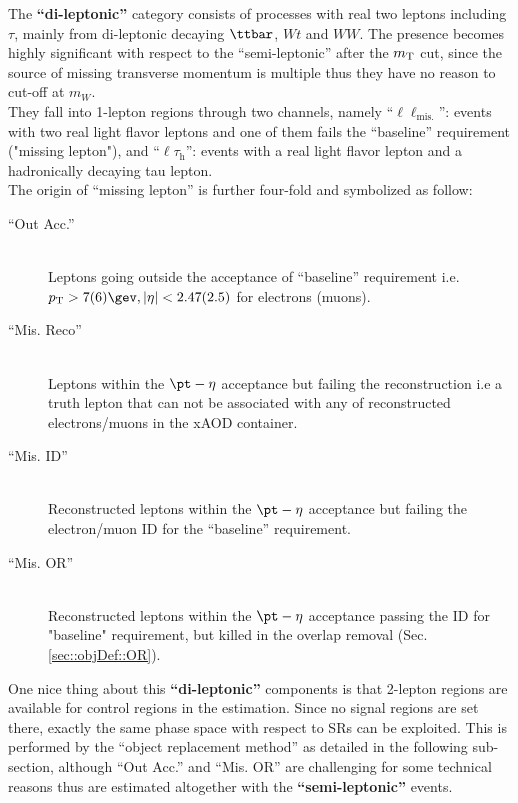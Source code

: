 The \textbf{``di-leptonic''} category consists of processes with real two leptons including $\tau$, mainly from di-leptonic decaying $\ttbar$, $Wt$ and $WW$. The presence becomes highly significant with respect to the ``semi-leptonic'' after the $m_{\mathrm{T}}$ cut, since the source of missing transverse momentum is multiple thus they have no reason to cut-off at $m_{W}$.  \\
They fall into 1-lepton regions through two channels, namely ``$\ell\ell_{\mathrm{mis.}}$'': events with two real light flavor leptons and one of them fails the ``baseline'' requirement ("missing lepton"), and ``$\ell\tau_{\mathrm{h}}$'': events with a real light flavor lepton and a hadronically decaying tau lepton. \\
%
The origin of ``missing lepton'' is further four-fold and symbolized as follow: 
\begin{description}
\item [``Out Acc.''] \mbox{} \\
 Leptons going outside the acceptance of ``baseline'' requirement i.e. $p_{\mathrm{T}}>7(6)\gev, |\eta|<2.47(2.5)$ for electrons (muons).
\item [``Mis. Reco''] \mbox{} \\
 Leptons within the $\pt-\eta$ acceptance but failing the reconstruction i.e a truth lepton that can not be associated with any of reconstructed electrons/muons in the xAOD container.
\item [``Mis. ID''] \mbox{} \\
 Reconstructed leptons within the $\pt-\eta$ acceptance but failing the electron/muon ID for the ``baseline'' requirement.
\item [``Mis. OR''] \mbox{} \\
 Reconstructed leptons within the $\pt-\eta$ acceptance passing the ID for "baseline" requirement, but killed in the overlap removal (Sec. \ref{sec::objDef::OR}). 
\end{description}

One nice thing about this \textbf{``di-leptonic''} components is that 2-lepton regions are available for control regions in the estimation. Since no signal regions are set there, exactly the same phase space with respect to SRs can be exploited. This is performed by the ``object replacement method'' as detailed in the following sub-section, although ``Out Acc.'' and ``Mis. OR'' are challenging for some technical reasons thus are estimated altogether with the  \textbf{``semi-leptonic''} events. \\
%

